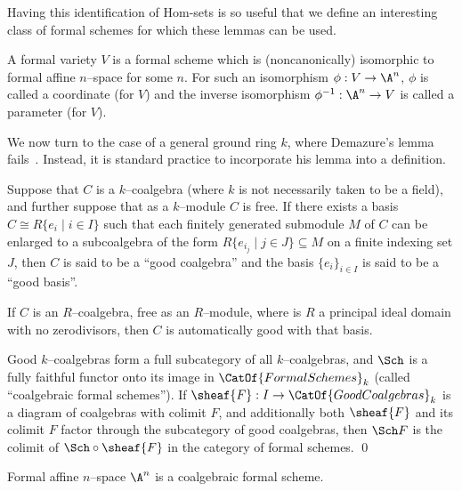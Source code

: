 \noindent Having this identification of Hom-sets is so useful that we define an interesting class of formal schemes for which these lemmas can be used.
\begin{definition}
A formal variety $V$ is a formal scheme which is (noncanonically) isomorphic to formal affine $n$--space for some $n$.  For such an isomorphism $\phi: V \to \A^n$, $\phi$ is called a coordinate (for $V$) and the inverse isomorphism $\phi^{-1}: \A^n \to V$ is called a parameter (for $V$).
\end{definition}

We now turn to the case of a general ground ring $k$, where Demazure's lemma fails~\cite[Appendix 5.3]{Michaelis}.  Instead, it is standard practice to incorporate his lemma into a definition.
\begin{definition}\label{DefnCoalgebraicScheme}
Suppose that $C$ is a $k$--coalgebra (where $k$ is not necessarily taken to be a field), and further suppose that as a $k$--module $C$ is free.  If there exists a basis $C \cong R\{e_i \mid i \in I\}$ such that each finitely generated submodule $M$ of $C$ can be enlarged to a subcoalgebra of the form $R\{e_{i_j} \mid j \in J\} \subseteq M$ on a finite indexing set $J$, then $C$ is said to be a ``good coalgebra'' and the basis $\{e_i\}_{i \in I}$ is said to be a ``good basis''.
\end{definition}

\begin{remark}
If $C$ is an $R$--coalgebra, free as an $R$--module, where is $R$ a principal ideal domain with no zerodivisors, then $C$ is automatically good with that basis.
\end{remark}

\begin{theorem}
Good $k$--coalgebras form a full subcategory of all $k$--coalgebras, and $\Sch$ is a fully faithful functor onto its image in $\CatOf{FormalSchemes}_k$ (called ``coalgebraic formal schemes'').  If $\sheaf{F}: I \to \CatOf{GoodCoalgebras}_k$ is a diagram of coalgebras with colimit $F$, and additionally both $\sheaf{F}$ and its colimit $F$ factor through the subcategory of good coalgebras, then $\Sch F$ is the colimit of $\Sch \circ \sheaf{F}$ in the category of formal schemes. \qed
\end{theorem}

\begin{example}\label{FormalAffineSpaceEx}
Formal affine $n$--space $\A^n$ is a coalgebraic formal scheme.
\end{example}

